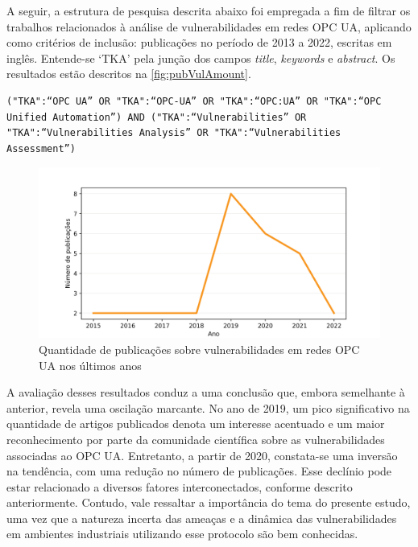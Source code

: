     A seguir, a estrutura de pesquisa descrita abaixo foi empregada a fim de filtrar os trabalhos relacionados à análise de vulnerabilidades em redes OPC UA, aplicando como critérios de inclusão: publicações no período de 2013 a 2022, escritas em inglês. Entende-se `TKA' pela junção dos campos \textit{title}, \textit{keywords} e \textit{abstract}. Os resultados estão descritos na \autoref{fig:pubVulAmount}.

    \begin{verbatim}
("TKA":“OPC UA” OR "TKA":“OPC-UA” OR "TKA":“OPC:UA” OR "TKA":“OPC Unified Automation”) AND ("TKA":“Vulnerabilities” OR "TKA":“Vulnerabilities Analysis” OR "TKA":“Vulnerabilities Assessment”)
    \end{verbatim}
    
    \begin{figure}[htbp]
        \caption{Quantidade de publicações sobre vulnerabilidades em redes OPC UA nos últimos anos}
        \label{fig:pubVulAmount}
        \begin{center}
            \includegraphics[width=0.7\linewidth]{USPSC-img/pubVulAmount.png}
        \end{center}
    \end{figure}
    
    A avaliação desses resultados conduz a uma conclusão que, embora semelhante à anterior, revela uma oscilação marcante. No ano de 2019, um pico significativo na quantidade de artigos publicados denota um interesse acentuado e um maior reconhecimento por parte da comunidade científica sobre as vulnerabilidades associadas ao OPC UA. Entretanto, a partir de 2020, constata-se uma inversão na tendência, com uma redução no número de publicações. Esse declínio pode estar relacionado a diversos fatores interconectados, conforme descrito anteriormente. Contudo, vale ressaltar a importância do tema do presente estudo, uma vez que a natureza incerta das ameaças e a dinâmica das vulnerabilidades em ambientes industriais utilizando esse protocolo são bem conhecidas.
    
